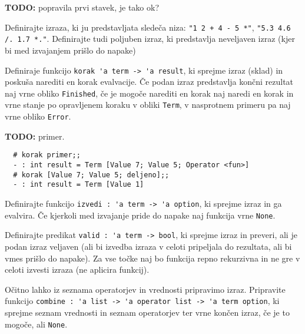 \documentclass[arhiv]{../izpit}
\begin{document}
\podnaloga
\textbf{TODO:} popravila prvi stavek, je tako ok?

Definirajte izraza, ki ju predstavljata sledeča niza: \verb|"1 2 + 4 - 5 *"|, \verb|"5.3 4.6 /. 1.7 *."|. 
   Definirajte tudi poljuben izraz, ki predstavlja neveljaven izraz (kjer bi med izvajanjem prišlo do napake)


\podnaloga
Definiraje funkcijo \verb|korak 'a term -> 'a result|, ki sprejme izraz (sklad) in poskuša narediti en korak evalvacije.
Če podan izraz predstavlja končni rezultat naj vrne obliko \verb|Finished|, 
če je mogoče narediti en korak naj naredi en korak in vrne stanje po opravljenem koraku v obliki \verb|Term|, 
v nasprotnem primeru pa naj vrne obliko \verb|Error|.

\textbf{TODO:} primer.

\begin{verbatim}
  # korak primer;;
  - : int result = Term [Value 7; Value 5; Operator <fun>]
  # korak [Value 7; Value 5; deljeno];;
  - : int result = Term [Value 1]

\end{verbatim}


\podnaloga
Definirajte funkcijo \verb|izvedi : 'a term -> 'a option|, ki sprejme izraz in ga evalvira. 
Če kjerkoli med izvajanje pride do napake naj funkcija vrne \verb|None|.


\podnaloga
Definirajte predikat \verb|valid : 'a term -> bool|, ki sprejme izraz in preveri, 
ali je podan izraz veljaven (ali bi izvedba izraza v celoti pripeljala do rezultata, 
ali bi vmes prišlo do napake). 
Za vse točke naj bo funkcija repno rekurzivna in ne gre v celoti izvesti izraza (ne aplicira funkcij).


\podnaloga
Očitno lahko iz seznama operatorjev in vrednosti pripravimo izraz. 
Pripravite funkcijo \verb|combine : 'a list -> 'a operator list -> 'a term option|, 
ki sprejme seznam vrednosti in seznam operatorjev ter vrne končen izraz, če je to mogoče, ali \verb|None|.
\end{document}
